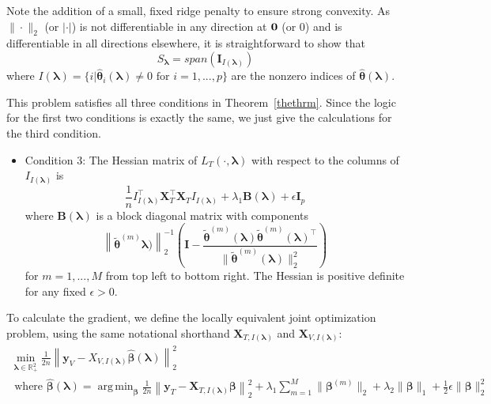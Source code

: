 \documentclass[10pt,letterpaper]{article}
\DeclareMathOperator*{\argmin}{arg\,min}
\begin{document}
Note the addition of a small, fixed ridge penalty to ensure strong convexity. As $\|\cdot\|_2$ (or $|\cdot|$) is not differentiable in any direction at ${\bf 0}$ (or $0$) and is differentiable in all directions elsewhere, it is straightforward to show that 
\begin{equation}
S_{\boldsymbol \lambda} = span(\boldsymbol I_{I(\boldsymbol\lambda)})
\end{equation}
where $I(\boldsymbol\lambda) = \{i | \hat{\boldsymbol{\theta}}_i(\boldsymbol\lambda) \ne 0 \text{ for } i=1,...,p \}$ are the nonzero indices of $\hat{\boldsymbol{\theta}}(\boldsymbol{\lambda})$. 

This problem satisfies all three conditions in Theorem~\ref{thethrm}. Since the logic for the first two conditions is exactly the same, we just give the calculations for the third condition.

\begin{itemize}
\item[] Condition 3: The Hessian matrix of $L_T(\cdot, \boldsymbol{\lambda})$ with respect to the columns of $I_{I(\boldsymbol \lambda)}$ is
\begin{equation}
\frac{1}{n} I_{I(\boldsymbol \lambda)}^\top \boldsymbol{X}_{T}^\top \boldsymbol{X}_{T} I_{I(\boldsymbol \lambda)}
+ \lambda_1 \boldsymbol{B}(\boldsymbol\lambda)
+ \epsilon \boldsymbol I_p
\end{equation}
where $\boldsymbol{B}(\boldsymbol\lambda)$ is a block diagonal matrix with components 
\begin{equation}
\left \| \tilde{\boldsymbol{\theta}}^{(m)}
\boldsymbol{\lambda})\right\|_2^{-1} 
\left (
\boldsymbol{I} - 
\frac{\tilde{\boldsymbol{\theta}}^{(m)}(\boldsymbol{\lambda})\tilde{\boldsymbol{\theta}}^{(m)}(\boldsymbol{\lambda})^\top}{\|\tilde{\boldsymbol{\theta}}^{(m)}(\boldsymbol{\lambda})\|_2^2}
\right)
\end{equation}
for $m=1,...,M$ from top left to bottom right. The Hessian is positive definite for any fixed $\epsilon > 0$.
\hfill {}
\end{itemize}

To calculate the gradient, we define the locally equivalent joint optimization problem, using the same notational shorthand $\boldsymbol{X}_{T, I(\boldsymbol\lambda)}$ and $\boldsymbol{X}_{V, I(\boldsymbol\lambda)}$:
\begin{equation}
\begin{array}{c}
\min_{\boldsymbol{\lambda} \in \mathbb{R}^2_{+}} \frac{1}{2n} \left \| \boldsymbol{y}_V - X_{V,I(\boldsymbol\lambda)} \hat{\boldsymbol\beta}(\boldsymbol{\lambda}) \right \|^2_2 \\
\text{ where }
\hat{\boldsymbol{\beta}}(\boldsymbol{\lambda}) = \argmin_{\boldsymbol \beta}
\frac{1}{2n} \left \| \boldsymbol{y}_T - \boldsymbol{X}_{T, I(\boldsymbol\lambda)} \boldsymbol \beta \right \|^2_2
+ \lambda_1 \sum_{m=1}^M \| \boldsymbol \beta^{(m)} \|_2
+ \lambda_2 \| \boldsymbol \beta \|_1
+ \frac{1}{2}\epsilon \| \boldsymbol \beta \|_2^2
\end{array}
\end{equation}
\end{document}
